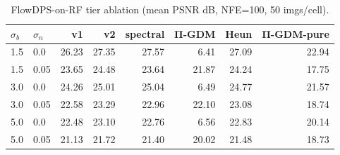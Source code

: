 \begin{table}[h]
  \centering
  \caption{FlowDPS-on-RF tier ablation (mean PSNR dB, NFE=100, 50 imgs/cell).}
  \label{tab:tier_flowdps}
  \begin{tabular}{llrrrrrr}
    \toprule
    $\sigma_b$ & $\sigma_n$ & v1 & v2 & spectral & Π-GDM & Heun & Π-GDM-pure \\
    \midrule
    1.5 & 0.0 & 26.23 & 27.35 & 27.57 & 6.41 & 27.09 & 22.94 \\
    1.5 & 0.05 & 23.65 & 24.48 & 23.64 & 21.87 & 24.24 & 17.75 \\
    3.0 & 0.0 & 24.26 & 25.01 & 25.04 & 6.49 & 24.77 & 21.57 \\
    3.0 & 0.05 & 22.58 & 23.29 & 22.96 & 22.10 & 23.08 & 18.74 \\
    5.0 & 0.0 & 22.48 & 23.10 & 22.76 & 6.56 & 22.83 & 20.14 \\
    5.0 & 0.05 & 21.13 & 21.72 & 21.40 & 20.02 & 21.48 & 18.73 \\
    \bottomrule
  \end{tabular}
\end{table}
